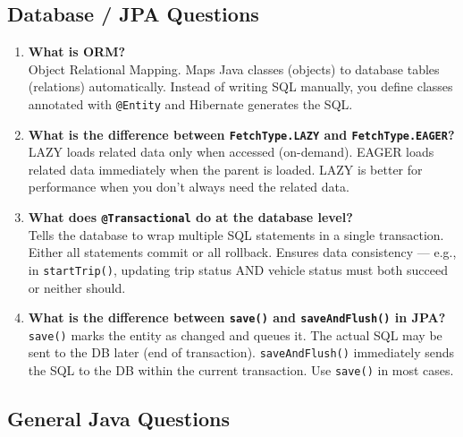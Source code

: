 \documentclass[12pt,a4paper]{report}
\newcommand{\code}[1]{\texttt{\textcolor{keywordblue}{#1}}}
\begin{document}
\subsection{Database / JPA Questions}

\begin{enumerate}[resume]
  \item \textbf{What is ORM?}\\
  Object Relational Mapping. Maps Java classes (objects) to database tables (relations) automatically. Instead of writing SQL manually, you define classes annotated with \code{@Entity} and Hibernate generates the SQL.

  \item \textbf{What is the difference between \code{FetchType.LAZY} and \code{FetchType.EAGER}?}\\
  LAZY loads related data only when accessed (on-demand). EAGER loads related data immediately when the parent is loaded. LAZY is better for performance when you don't always need the related data.

  \item \textbf{What does \code{@Transactional} do at the database level?}\\
  Tells the database to wrap multiple SQL statements in a single transaction. Either all statements commit or all rollback. Ensures data consistency --- e.g., in \code{startTrip()}, updating trip status AND vehicle status must both succeed or neither should.

  \item \textbf{What is the difference between \code{save()} and \code{saveAndFlush()} in JPA?}\\
  \code{save()} marks the entity as changed and queues it. The actual SQL may be sent to the DB later (end of transaction). \code{saveAndFlush()} immediately sends the SQL to the DB within the current transaction. Use \code{save()} in most cases.
\end{enumerate}

\subsection{General Java Questions}
\end{document}
